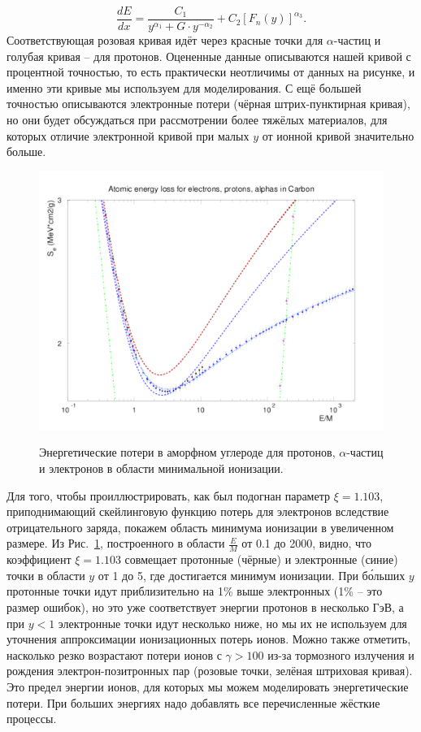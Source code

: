 \documentclass[a4paper,12pt]{article}
\begin{document}
\begin{large}
  \begin{equation}
  \label{TPTfitform}
    \frac{dE}{dx}=\frac{C_1}{y^{\alpha_1}+G\cdot y^{-\alpha_2}}+C_2 [F_n(y)]^{\alpha_3}.
  \end{equation}
  Соответствующая розовая кривая идёт через красные точки для $\alpha$-частиц и голубая кривая -- для протонов.
  Оцененные данные описываются нашей кривой с процентной точностью, то есть практически неотличимы от данных на рисунке, и именно эти кривые мы используем для моделирования.
  С ещё большей точностью описываются электронные потери (чёрная штрих-пунктирная кривая), но они будет обсуждаться при рассмотрении более тяжёлых материалов, для которых отличие электронной кривой при малых $y$ от ионной кривой значительно больше.
  
  \begin{figure}[ht]
    {
       \includegraphics[width=0.99\linewidth]{images/epa_c_s}
    }
    \caption{Энергетические потери в аморфном углероде для протонов, $\alpha$-частиц и электронов в области минимальной ионизации.}
    \label{fig:dEdxCS}
  \end{figure}
  Для того, чтобы проиллюстрировать, как был подогнан параметр $\xi=1.103$, приподнимающий скейлинговую функцию потерь для электронов вследствие отрицательного заряда, покажем область минимума ионизации в увеличенном размере. 
  Из Рис.~\ref{fig:dEdxCS}, построенного в области $\frac{E}{M}$ от 0.1 до 2000, видно, что коэффициент $\xi=1.103$ совмещает протонные (чёрные) и электронные (синие) точки в области $y$ от 1 до 5, где достигается минимум ионизации.
  При б\'{о}льших $y$ протонные точки идут приблизительно на 1\% выше электронных (1\% -- это размер ошибок), но это уже соответствует энергии протонов в несколько ГэВ, а при $y < 1$ электронные точки идут несколько ниже, но мы их не используем для уточнения аппроксимации ионизационных потерь ионов.
  Можно также отметить, насколько резко возрастают потери ионов с $\gamma > 100$ из-за тормозного излучения и рождения электрон-позитронных пар (розовые точки, зелёная штриховая кривая).
  Это предел энергии ионов, для которых мы можем моделировать энергетические потери.
  При больших энергиях надо добавлять все перечисленные жёсткие процессы.
  

\end{large}
\end{document}
